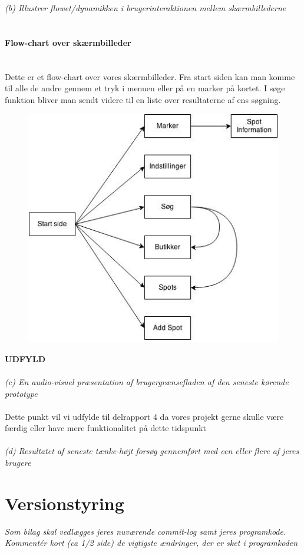 \documentclass[12pt]{article}
\begin{document}
\newpage
\textit{(b) Illustrer flowet/dynamikken i brugerinteraktionen mellem skærmbillederne}\\\\
\paragraph{Flow-chart over skærmbilleder}\mbox{}\\
Dette er et flow-chart over vores skærmbilleder. Fra start siden kan man komme til alle de andre gennem et tryk i menuen eller på en marker på kortet. I søge funktion bliver man sendt videre til en liste over resultaterne af ens søgning.
\begin{figure}[h]
\includegraphics[scale = 0.5]{flowDiagram}
\end{figure}
\newpage
\textbf{UDFYLD}\\\\
\textit{(c) En audio-visuel præsentation af brugergrænsefladen af den seneste kørende prototype}\\\\
Dette punkt vil vi udfylde til delrapport 4 da vores projekt gerne skulle være færdig eller have mere funktionalitet på dette tidspunkt\\\\

\textit{(d) Resultatet af seneste tænke-højt forsøg gennemført med een eller flere af jeres brugere}


\pagebreak
\section{Versionstyring}
\textit{Som bilag skal vedlægges jeres nuværende commit-log samt jeres
programkode. Kommentér kort (ca 1/2 side) de vigtigste ændringer, der er sket i programkoden}\\
\end{document}
